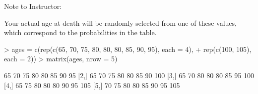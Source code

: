Note to Instructor:

Your actual age at death will be randomly selected from one of these
values, which correspond to the probabilities in the table.

{ \Large
\begin{Schunk}
\begin{Sinput}
> ages = c(rep(c(65, 70, 75, 80, 80, 80, 85, 90, 95), each = 4), 
+     rep(c(100, 105), each = 2))
> matrix(ages, nrow = 5)
\end{Sinput}
\begin{Soutput}
     [,1] [,2] [,3] [,4] [,5] [,6] [,7] [,8]
[1,]   65   70   75   80   80   85   90   95
[2,]   65   70   75   80   80   85   90  100
[3,]   65   70   80   80   80   85   95  100
[4,]   65   75   80   80   80   90   95  105
[5,]   70   75   80   80   85   90   95  105
\end{Soutput}
\end{Schunk}
}

